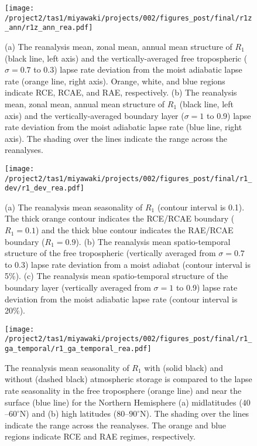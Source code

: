 \documentclass{ametsocV5}
\begin{document}
\begin{figure}[t]
  \centering
  \noindent\texttt{[image: /project2/tas1/miyawaki/projects/002/figures\_post/final/r1z\_ann/r1z\_ann\_rea.pdf]}\\
  \caption{(a) The reanalysis mean, zonal mean, annual mean structure of $R_1$ (black line, left axis) and the vertically-averaged free tropospheric ($\sigma=0.7$ to 0.3) lapse rate deviation from the moist adiabatic lapse rate (orange line, right axis). Orange, white, and blue regions indicate RCE, RCAE, and RAE, respectively. (b) The reanalysis mean, zonal mean, annual mean structure of $R_1$ (black line, left axis) and the vertically-averaged boundary layer ($\sigma=1$ to 0.9) lapse rate deviation from the moist adiabatic lapse rate (blue line, right axis). The shading over the lines indicate the range across the reanalyses.}
  \label{fig:rea-r1-ann}
\end{figure}

\begin{figure}[t]
  \centering
  \noindent\texttt{[image: /project2/tas1/miyawaki/projects/002/figures\_post/final/r1\_dev/r1\_dev\_rea.pdf]}\\
  \caption{(a) The reanalysis mean seasonality of $R_{1}$ (contour interval is 0.1). The thick orange contour indicates the RCE/RCAE boundary ($R_1=0.1$) and the thick blue contour indicates the RAE/RCAE boundary ($R_1 = 0.9$). (b) The reanalysis mean spatio-temporal structure of the free tropospheric (vertically averaged from $\sigma=0.7$ to 0.3) lapse rate deviation from a moist adiabat (contour interval is 5\%). (c) The reanalysis mean spatio-temporal structure of the boundary layer (vertically averaged from $\sigma=1$ to 0.9) lapse rate deviation from the moist adiabatic lapse rate (contour interval is 20\%).}
  \label{fig:rea-r1-dev}
\end{figure}

\begin{figure}[t]
  \noindent\texttt{[image: /project2/tas1/miyawaki/projects/002/figures\_post/final/r1\_ga\_temporal/r1\_ga\_temporal\_rea.pdf]}\\
  \caption{The reanalysis mean seasonality of $R_1$ with (solid black) and without (dashed black) atmospheric storage is compared to the lapse rate seasonality in the free troposphere (orange line) and near the surface (blue line) for the Northern Hemisphere (a) midlatitudes ($40$--$60^\circ$N) and (b) high latitudes ($80$--$90^\circ$N). The shading over the lines indicate the range across the reanalyses. The orange and blue regions indicate RCE and RAE regimes, respectively.}
  \label{fig:rea-r1-ga-temporal}
\end{figure}
\end{document}
